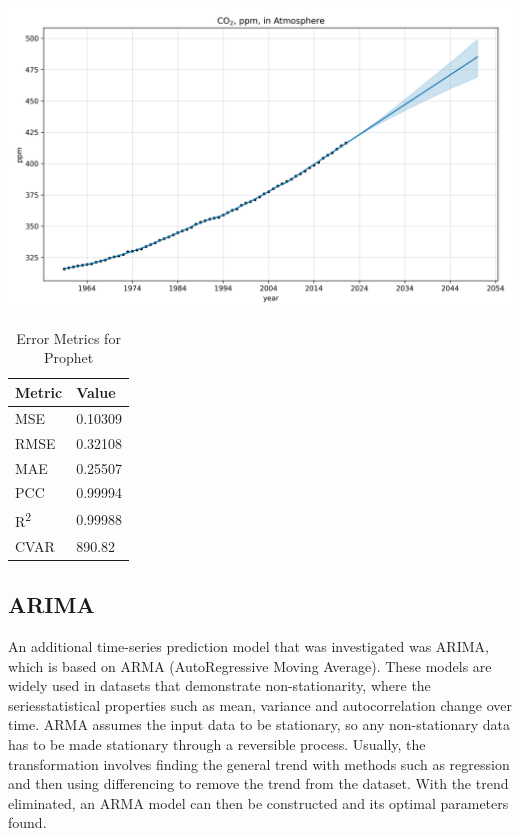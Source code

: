 \documentclass[12pt]{mcmthesis}
\begin{document}
    \begin{table}[h]
        \begin{minipage}{0.7\linewidth}
            \centering
            \includegraphics[width=\textwidth]{co2_prophet}%
            \label{fig:co2_prophet}
        \end{minipage}%
        \begin{minipage}{0.3\linewidth}
            \centering
            \begin{tabular}{ll}
                \toprule
                Metric               & Value   \\
                \midrule
                MSE                  & 0.10309 \\
                RMSE                 & 0.32108 \\
                MAE                  & 0.25507 \\
                PCC                  & 0.99994 \\
                R\textsuperscript{2} & 0.99988 \\
                CVAR                 & 890.82  \\
                \bottomrule
            \end{tabular}
            \vspace{8pt}
            \caption{Error Metrics for Prophet}
            \label{tab:co2_prophet_err}
        \end{minipage}
    \end{table}


    \subsection{ARIMA}
    An additional time-series prediction model that was investigated was ARIMA, which is based on ARMA (AutoRegressive Moving Average). These models are widely used in datasets that demonstrate non-stationarity, where the series\textquotesingle statistical properties such as mean, variance and autocorrelation change over time. ARMA assumes the input data to be stationary, so any non-stationary data has to be made stationary through a reversible process. Usually, the transformation involves finding the general trend with methods such as regression and then using differencing to remove the trend from the dataset. With the trend eliminated, an ARMA model can then be constructed and its optimal parameters found.
\end{document}
